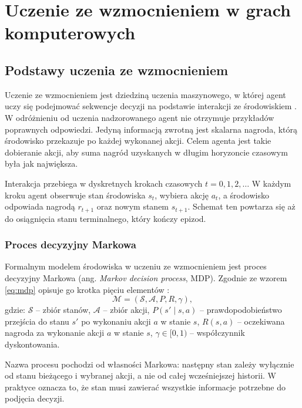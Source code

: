 \section{Uczenie ze wzmocnieniem w grach komputerowych}
\label{sec:rl-gry}

\subsection{Podstawy uczenia ze wzmocnieniem}
\label{subsec:podstawy-rl}

Uczenie ze wzmocnieniem jest dziedziną uczenia maszynowego, w której agent uczy się podejmować sekwencje decyzji na podstawie interakcji ze środowiskiem \cite{sutton2018}. W odróżnieniu od uczenia nadzorowanego agent nie otrzymuje przykładów poprawnych odpowiedzi. Jedyną informacją zwrotną jest skalarna nagroda, którą środowisko przekazuje po każdej wykonanej akcji. Celem agenta jest takie dobieranie akcji, aby suma nagród uzyskanych w długim horyzoncie czasowym była jak największa.

Interakcja przebiega w dyskretnych krokach czasowych $t = 0, 1, 2, \ldots$ W każdym kroku agent obserwuje stan środowiska $s_t$, wybiera akcję $a_t$, a środowisko odpowiada nagrodą $r_{t+1}$ oraz nowym stanem $s_{t+1}$. Schemat ten powtarza się aż do osiągnięcia stanu terminalnego, który kończy epizod.

\subsubsection{Proces decyzyjny Markowa}

Formalnym modelem środowiska w uczeniu ze wzmocnieniem jest proces decyzyjny Markowa (ang. \emph{Markov decision process}, MDP). Zgodnie ze wzorem \eqref{eq:mdp} opisuje go krotka pięciu elementów \cite{sutton2018}:
\begin{equation}
	\mathcal{M} = (\mathcal{S}, \mathcal{A}, P, R, \gamma),
	\label{eq:mdp}
\end{equation}
gdzie: $\mathcal{S}$ -- zbiór stanów, $\mathcal{A}$ -- zbiór akcji, $P(s' \mid s, a)$ -- prawdopodobieństwo przejścia do stanu $s'$ po wykonaniu akcji $a$ w stanie $s$, $R(s, a)$ -- oczekiwana nagroda za wykonanie akcji $a$ w stanie $s$, $\gamma \in [0, 1)$ -- współczynnik dyskontowania.

Nazwa procesu pochodzi od własności Markowa: następny stan zależy wyłącznie od stanu bieżącego i wybranej akcji, a nie od całej wcześniejszej historii. W praktyce oznacza to, że stan musi zawierać wszystkie informacje potrzebne do podjęcia decyzji.

